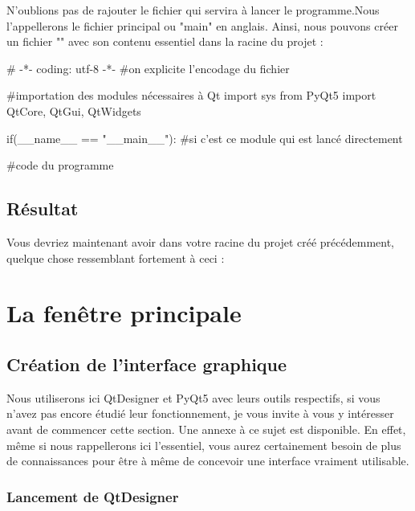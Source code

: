 N'oublions pas de rajouter le fichier qui servira à lancer le programme.Nous l'appellerons le fichier principal ou "main" en anglais.\newline
Ainsi, nous pouvons créer un fichier "" avec son contenu essentiel dans la racine du projet :

\begin{pyCode}
# -*- coding: utf-8 -*-
#on explicite l'encodage du fichier

#importation des modules nécessaires à Qt
import sys
from PyQt5 import QtCore, QtGui, QtWidgets


if(__name__ == "__main__"): #si c'est ce module qui est lancé directement

	#code du programme

\end{pyCode}

\subsection{Résultat}

Vous devriez maintenant avoir dans votre racine du projet créé précédemment, quelque chose ressemblant fortement à ceci :



\section{La fenêtre principale}

\subsection{Création de l'interface graphique}

Nous utiliserons ici QtDesigner et PyQt5 avec leurs outils respectifs, si vous n'avez pas encore étudié leur fonctionnement, je vous invite à vous y intéresser avant de commencer cette section. Une annexe à ce sujet est disponible.\newline
En effet, même si nous rappellerons ici l'essentiel, vous aurez certainement besoin de plus de connaissances pour être à même de concevoir une interface vraiment utilisable.

\subsubsection{Lancement de QtDesigner}

